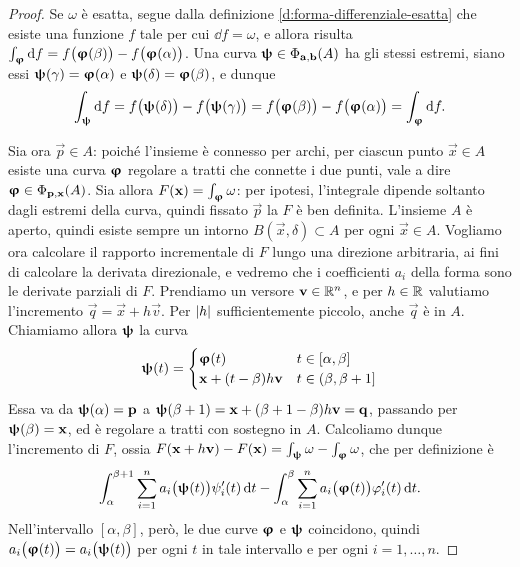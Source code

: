 \begin{proof}
	Se $\omega$ è esatta, segue dalla definizione \ref{d:forma-differenziale-esatta} che esiste una funzione $f$ tale per cui $\dd f=\omega$, e allora risulta $\int_{\bm{\upvarphi}}\textup{d} f=f\big(\bm{\upvarphi}(\beta)\big)-f\big(\bm{\upvarphi}(\alpha)\big)$.
	Una curva $\bm{\uppsi}\in\Phi_{\mathbf{a},\mathbf{b}}(A)$ ha gli stessi estremi, siano essi $\bm{\uppsi}(\gamma)=\bm{\upvarphi}(\alpha)$ e $\bm{\uppsi}(\delta)=\bm{\upvarphi}(\beta)$, e dunque
	\begin{equation}
		\int_{\bm{\uppsi}}\textup{d} f=f\big(\bm{\uppsi}(\delta)\big)-f\big(\bm{\uppsi}(\gamma)\big)=f\big(\bm{\upvarphi}(\beta)\big)-f\big(\bm{\upvarphi}(\alpha)\big)=\int_{\bm{\upvarphi}}\textup{d} f.
	\end{equation}
	
	Sia ora $\vec p\in A$: poiché l'insieme è connesso per archi, per ciascun punto $\vec x\in A$ esiste una curva $\bm{\upvarphi}$ regolare a tratti che connette i due punti, vale a dire $\bm{\upvarphi}\in\Phi_{\mathbf{p},\mathbf{x}}(A)$.
	Sia allora $F(\mathbf{x})=\int_{\bm{\upvarphi}}\omega$: per ipotesi, l'integrale dipende soltanto dagli estremi della curva, quindi fissato $\vec p$ la $F$ è ben definita.
	L'insieme $A$ è aperto, quindi esiste sempre un intorno $B(\vec x,\delta)\subset A$ per ogni $\vec x\in A$.
	Vogliamo ora calcolare il rapporto incrementale di $F$ lungo una direzione arbitraria, ai fini di calcolare la derivata direzionale, e vedremo che i coefficienti $a_i$ della forma sono le derivate parziali di $F$.
	Prendiamo un versore $\mathbf{v}\in\mathbb{R}^n$, e per $h\in\mathbb{R}$ valutiamo l'incremento $\vec q=\vec x+h\vec v$.
	Per $\lvert h\rvert$ sufficientemente piccolo, anche $\vec q$ è in $A$.
	Chiamiamo allora $\bm{\uppsi}$ la curva
	\begin{equation*}
		\bm{\uppsi}(t)=
		\begin{cases}
			\bm{\upvarphi}(t)	&t\in[\alpha,\beta]\\
			\mathbf{x}+(t-\beta)h\mathbf{v}	&t\in(\beta,\beta+1]
		\end{cases}
	\end{equation*}
	Essa va da $\bm{\uppsi}(\alpha)=\mathbf{p}$ a $\bm{\uppsi}(\beta+1)=\mathbf{x}+(\beta+1-\beta)h\mathbf{v}=\mathbf{q}$, passando per $\bm{\uppsi}(\beta)=\mathbf{x}$, ed è regolare a tratti con sostegno in $A$.
	Calcoliamo dunque l'incremento di $F$, ossia $F(\mathbf{x}+h\mathbf{v})-F(\mathbf{x})=\int_{\bm{\uppsi}}\omega-\int_{\bm{\upvarphi}}\omega$, che per definizione è
	\begin{equation}
		\int_\alpha^{\beta+1}\sum_{i=1}^na_i\big(\bm{\uppsi}(t)\big)\psi_i'(t)\,\textup{d} t-\int_\alpha^\beta\sum_{i=1}^na_i\big(\bm{\upvarphi}(t)\big)\varphi_i'(t)\,\textup{d} t.
	\end{equation}
	Nell'intervallo $[\alpha,\beta]$, però, le due curve $\bm{\upvarphi}$ e $\bm{\uppsi}$ coincidono, quindi $a_i\big(\bm{\upvarphi}(t)\big)=a_i\big(\bm{\uppsi}(t)\big)$ per ogni $t$ in tale intervallo e per ogni $i=1,\dots,n$.

\end{proof}
